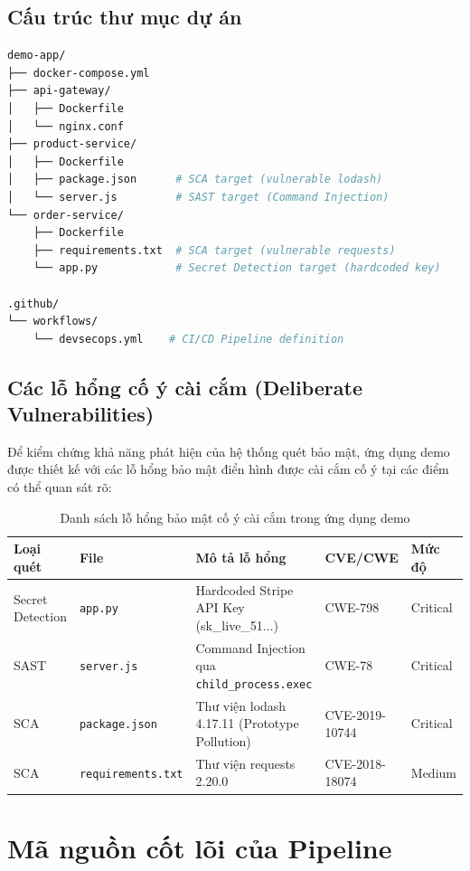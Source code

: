 \documentclass[12pt,a4paper]{report}
\begin{document}
\subsection{Cấu trúc thư mục dự án}

\begin{lstlisting}[language=bash, caption={Cấu trúc thư mục dự án}]
demo-app/
├── docker-compose.yml
├── api-gateway/
│   ├── Dockerfile
│   └── nginx.conf
├── product-service/
│   ├── Dockerfile
│   ├── package.json      # SCA target (vulnerable lodash)
│   └── server.js         # SAST target (Command Injection)
└── order-service/
    ├── Dockerfile
    ├── requirements.txt  # SCA target (vulnerable requests)
    └── app.py            # Secret Detection target (hardcoded key)

.github/
└── workflows/
    └── devsecops.yml    # CI/CD Pipeline definition
\end{lstlisting}

\subsection{Các lỗ hổng cố ý cài cắm (Deliberate Vulnerabilities)}

Để kiểm chứng khả năng phát hiện của hệ thống quét bảo mật, ứng dụng demo được thiết kế với các lỗ hổng bảo mật điển hình được cài cắm cố ý tại các điểm có thể quan sát rõ:

\begin{table}[H]
\centering
\caption{Danh sách lỗ hổng bảo mật cố ý cài cắm trong ứng dụng demo}
\label{tab:vulnerabilities}
\begin{tabularx}{\textwidth}{|l|l|X|l|l|}
\hline
\textbf{Loại quét} & \textbf{File} & \textbf{Mô tả lỗ hổng} & \textbf{CVE/CWE} & \textbf{Mức độ} \\
\hline
Secret Detection & \texttt{app.py} & Hardcoded Stripe API Key (sk\_live\_51...) & CWE-798 & Critical \\
\hline
SAST & \texttt{server.js} & Command Injection qua \texttt{child\_process.exec} & CWE-78 & Critical \\
\hline
SCA & \texttt{package.json} & Thư viện lodash 4.17.11 (Prototype Pollution) & CVE-2019-10744 & Critical \\
\hline
SCA & \texttt{requirements.txt} & Thư viện requests 2.20.0 & CVE-2018-18074 & Medium \\
\hline
\end{tabularx}
\end{table}

\section{Mã nguồn cốt lõi của Pipeline}
\end{document}
